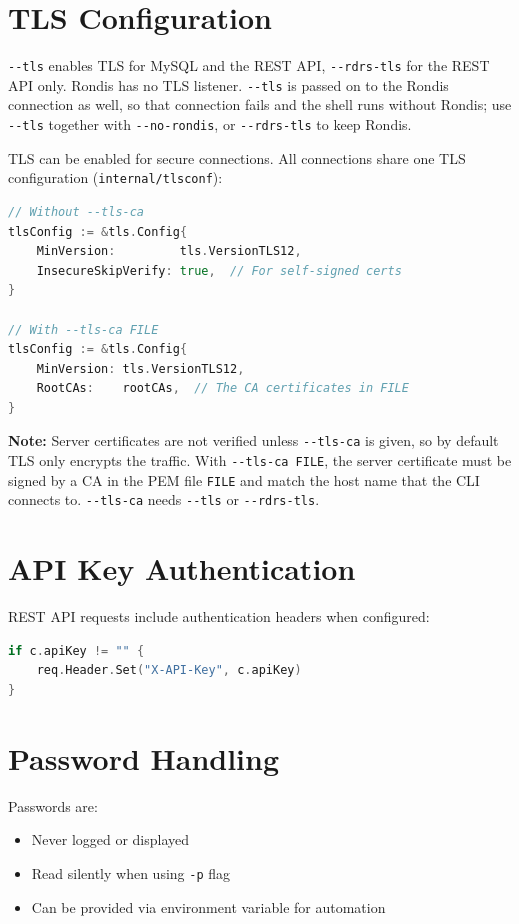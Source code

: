 \documentclass[11pt,a4paper]{report}
\begin{document}
\section{TLS Configuration}

\texttt{-{}-tls} enables TLS for MySQL and the REST API, \texttt{-{}-rdrs-tls} for the REST API only. Rondis has no TLS listener. \texttt{-{}-tls} is passed on to the Rondis connection as well, so that connection fails and the shell runs without Rondis; use \texttt{-{}-tls} together with \texttt{-{}-no-rondis}, or \texttt{-{}-rdrs-tls} to keep Rondis.

TLS can be enabled for secure connections. All connections share one TLS configuration (\texttt{internal/tlsconf}):

\begin{lstlisting}[language=Go]
// Without --tls-ca
tlsConfig := &tls.Config{
    MinVersion:         tls.VersionTLS12,
    InsecureSkipVerify: true,  // For self-signed certs
}

// With --tls-ca FILE
tlsConfig := &tls.Config{
    MinVersion: tls.VersionTLS12,
    RootCAs:    rootCAs,  // The CA certificates in FILE
}
\end{lstlisting}

\textbf{Note:} Server certificates are not verified unless \texttt{-{}-tls-ca} is given, so by default TLS only encrypts the traffic. With \texttt{-{}-tls-ca FILE}, the server certificate must be signed by a CA in the PEM file \texttt{FILE} and match the host name that the CLI connects to. \texttt{-{}-tls-ca} needs \texttt{-{}-tls} or \texttt{-{}-rdrs-tls}.

\section{API Key Authentication}

REST API requests include authentication headers when configured:

\begin{lstlisting}[language=Go]
if c.apiKey != "" {
    req.Header.Set("X-API-Key", c.apiKey)
}
\end{lstlisting}

\section{Password Handling}

Passwords are:
\begin{itemize}
    \item Never logged or displayed
    \item Read silently when using \texttt{-p} flag
    \item Can be provided via environment variable for automation
\end{itemize}
\end{document}
